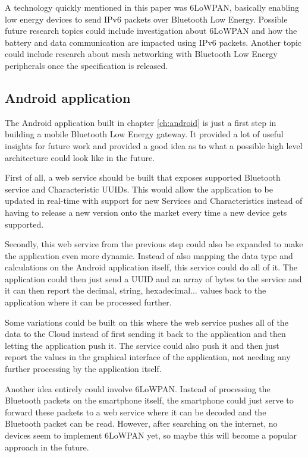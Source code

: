 \documentclass[pdftex,a4paper,12pt,twoside]{report}
\begin{document}
A technology quickly mentioned in this paper was 6LoWPAN, basically enabling low energy devices to send IPv6 packets over Bluetooth Low Energy. Possible future research topics could include investigation about 6LoWPAN and how the battery and data communication are impacted using IPv6 packets. Another topic could include research about mesh networking with Bluetooth Low Energy peripherals once the specification is released.

\subsection{Android application}
\label{subsec:androidapp}
The Android application built in chapter \ref{ch:android} is just a first step in building a mobile Bluetooth Low Energy gateway. It provided a lot of useful insights for future work and provided a good idea as to what a possible high level architecture could look like in the future.

First of all, a web service should be built that exposes supported Bluetooth service and Characteristic UUIDs. This would allow the application to be updated in real-time with support for new Services and Characteristics instead of having to release a new version onto the market every time a new device gets supported.

Secondly, this web service from the previous step could also be expanded to make the application even more dynamic. Instead of also mapping the data type and calculations on the Android application itself, this service could do all of it. The application could then just send a UUID and an array of bytes to the service and it can then report the decimal, string, hexadecimal... values back to the application where it can be processed further.

Some variations could be built on this where the web service pushes all of the data to the Cloud instead of first sending it back to the application and then letting the application push it. The service could also push it and then just report the values in the graphical interface of the application, not needing any further processing by the application itself.

Another idea entirely could involve 6LoWPAN. Instead of processing the Bluetooth packets on the smartphone itself, the smartphone could just serve to forward these packets to a web service where it can be decoded and the Bluetooth packet can be read. However, after searching on the internet, no devices seem to implement 6LoWPAN yet, so maybe this will become a popular approach in the future.
\end{document}
